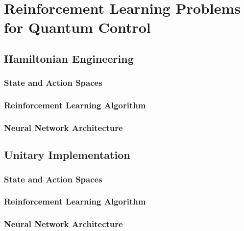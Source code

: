 \chapter{Reinforcement Learning Problems for Quantum Control}


\section{Hamiltonian Engineering}

\subsection{State and Action Spaces}

\lipsum[1-2]


\subsection{Reinforcement Learning Algorithm}

\lipsum[1-6]

\subsection{Neural Network Architecture}

\lipsum[1-2]

\section{Unitary Implementation}

\lipsum[1]

\subsection{State and Action Spaces}

\lipsum[1-2]

\subsection{Reinforcement Learning Algorithm}

\lipsum[1-6]

\subsection{Neural Network Architecture}

\lipsum[1-2]

